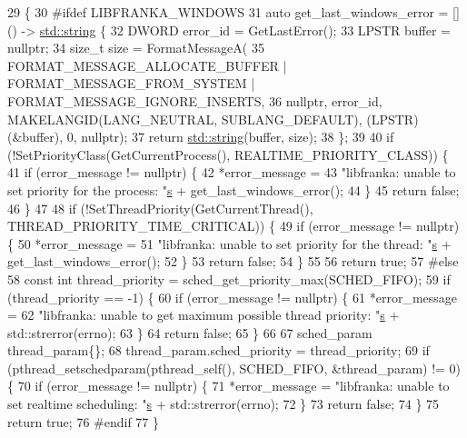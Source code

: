 \begin{DoxyCode}
29                                                                           \{
30 \textcolor{preprocessor}{#ifdef LIBFRANKA\_WINDOWS}
31   \textcolor{keyword}{auto} get\_last\_windows\_error = []() -> \hyperlink{namespacetesting_1_1internal_a8e8ff5b11e64078831112677156cb111}{std::string} \{
32     DWORD error\_id = GetLastError();
33     LPSTR buffer = \textcolor{keyword}{nullptr};
34     \textcolor{keywordtype}{size\_t} size = FormatMessageA(
35         FORMAT\_MESSAGE\_ALLOCATE\_BUFFER | FORMAT\_MESSAGE\_FROM\_SYSTEM | FORMAT\_MESSAGE\_IGNORE\_INSERTS,
36         \textcolor{keyword}{nullptr}, error\_id, MAKELANGID(LANG\_NEUTRAL, SUBLANG\_DEFAULT), (LPSTR)(&buffer), 0, \textcolor{keyword}{nullptr});
37     \textcolor{keywordflow}{return} \hyperlink{namespacetesting_1_1internal_a8e8ff5b11e64078831112677156cb111}{std::string}(buffer, size);
38   \};
39 
40   \textcolor{keywordflow}{if} (!SetPriorityClass(GetCurrentProcess(), REALTIME\_PRIORITY\_CLASS)) \{
41     \textcolor{keywordflow}{if} (error\_message != \textcolor{keyword}{nullptr}) \{
42       *error\_message =
43           \textcolor{stringliteral}{"libfranka: unable to set priority for the process: "}\hyperlink{namespaceservice__node__3_aa976421a49e0b54f23833423400849ae}{s} + get\_last\_windows\_error();
44     \}
45     \textcolor{keywordflow}{return} \textcolor{keyword}{false};
46   \}
47 
48   \textcolor{keywordflow}{if} (!SetThreadPriority(GetCurrentThread(), THREAD\_PRIORITY\_TIME\_CRITICAL)) \{
49     \textcolor{keywordflow}{if} (error\_message != \textcolor{keyword}{nullptr}) \{
50       *error\_message =
51           \textcolor{stringliteral}{"libfranka: unable to set priority for the thread: "}\hyperlink{namespaceservice__node__3_aa976421a49e0b54f23833423400849ae}{s} + get\_last\_windows\_error();
52     \}
53     \textcolor{keywordflow}{return} \textcolor{keyword}{false};
54   \}
55 
56   \textcolor{keywordflow}{return} \textcolor{keyword}{true};
57 \textcolor{preprocessor}{#else}
58   \textcolor{keyword}{const} \textcolor{keywordtype}{int} thread\_priority = sched\_get\_priority\_max(SCHED\_FIFO);
59   \textcolor{keywordflow}{if} (thread\_priority == -1) \{
60     \textcolor{keywordflow}{if} (error\_message != \textcolor{keyword}{nullptr}) \{
61       *error\_message =
62           \textcolor{stringliteral}{"libfranka: unable to get maximum possible thread priority: "}\hyperlink{namespaceservice__node__3_aa976421a49e0b54f23833423400849ae}{s} + std::strerror(errno);
63     \}
64     \textcolor{keywordflow}{return} \textcolor{keyword}{false};
65   \}
66 
67   sched\_param thread\_param\{\};
68   thread\_param.sched\_priority = thread\_priority;
69   \textcolor{keywordflow}{if} (pthread\_setschedparam(pthread\_self(), SCHED\_FIFO, &thread\_param) != 0) \{
70     \textcolor{keywordflow}{if} (error\_message != \textcolor{keyword}{nullptr}) \{
71       *error\_message = \textcolor{stringliteral}{"libfranka: unable to set realtime scheduling: "}\hyperlink{namespaceservice__node__3_aa976421a49e0b54f23833423400849ae}{s} + std::strerror(errno);
72     \}
73     \textcolor{keywordflow}{return} \textcolor{keyword}{false};
74   \}
75   \textcolor{keywordflow}{return} \textcolor{keyword}{true};
76 \textcolor{preprocessor}{#endif}
77 \}
\end{DoxyCode}
